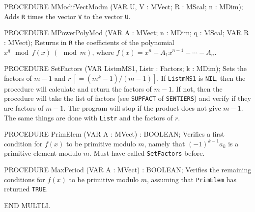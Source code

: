 PROCEDURE MModifVectModm (VAR U, V : MVect;  R : MScal;  n : MDim);
\endcode
  \tab  Adds {\tt R} times the vector {\tt V} to the vector {\tt U}.
  \endtab
\code

PROCEDURE MPowerPolyMod (VAR A : MVect;  n : MDim;  q : MScal;  VAR R : MVect);
\endcode
   \tab Returns in {\tt R} the coefficients of the polynomial
     $x^q \mod f(x) ~(\mod m)$,
     where $f(x) = x^n - A_1 x^{n-1} -\cdots- A_n$.
   \endtab
\code

PROCEDURE SetFactors (VAR ListmMS1, Listr : Factors;   k : MDim);
\endcode
   \tab Sets the factors of $m-1$ and $r ~[= (m^k-1)/(m-1)]$. If
        {\tt ListmMS1} is {\tt NIL}, then the procedure will calculate and
        return the factors of $m-1$. If not, then the procedure will take the
        list of factors (see {\tt SUPFACT} of {\tt SENTIERS}) and verify if
        they are factors of $m-1$. The program will stop if the product does
        not give $m-1$. The same things are done with {\tt Listr} and
        the factors of $r$.
   \endtab
\code

PROCEDURE PrimElem (VAR A : MVect) : BOOLEAN;
\endcode
   \tab  Verifies a first condition for $f(x)$ to be primitive modulo $m$,
    namely that $(-1)^{k-1} a_k$ is a primitive element modulo $m$.
    Must have called {\tt SetFactors} before.
   \endtab
\code

PROCEDURE MaxPeriod (VAR A : MVect) : BOOLEAN;
\endcode
   \tab  Verifies the remaining conditions for $f(x)$ to be primitive modulo
    $m$, assuming that {\tt PrimElem} has returned {\tt TRUE}.
   \endtab
\code

END MULTLI.
\endcode
